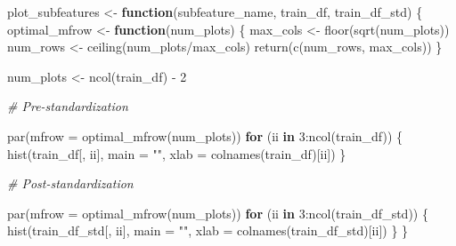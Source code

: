 \documentclass[
]{article}
\newenvironment{Shaded}{\begin{snugshade}}{\end{snugshade}}
\newcommand{\AttributeTok}[1]{\textcolor[rgb]{0.77,0.63,0.00}{#1}}
\newcommand{\CommentTok}[1]{\textcolor[rgb]{0.56,0.35,0.01}{\textit{#1}}}
\newcommand{\ControlFlowTok}[1]{\textcolor[rgb]{0.13,0.29,0.53}{\textbf{#1}}}
\newcommand{\DecValTok}[1]{\textcolor[rgb]{0.00,0.00,0.81}{#1}}
\newcommand{\FunctionTok}[1]{\textcolor[rgb]{0.00,0.00,0.00}{#1}}
\newcommand{\NormalTok}[1]{#1}
\newcommand{\OtherTok}[1]{\textcolor[rgb]{0.56,0.35,0.01}{#1}}
\newcommand{\SpecialCharTok}[1]{\textcolor[rgb]{0.00,0.00,0.00}{#1}}
\newcommand{\StringTok}[1]{\textcolor[rgb]{0.31,0.60,0.02}{#1}}
\begin{document}
\begin{Shaded}
\begin{Highlighting}[]
\NormalTok{plot\_subfeatures }\OtherTok{\textless{}{-}} \ControlFlowTok{function}\NormalTok{(subfeature\_name, train\_df, train\_df\_std) \{}
\NormalTok{    optimal\_mfrow }\OtherTok{\textless{}{-}} \ControlFlowTok{function}\NormalTok{(num\_plots) \{}
\NormalTok{        max\_cols }\OtherTok{\textless{}{-}} \FunctionTok{floor}\NormalTok{(}\FunctionTok{sqrt}\NormalTok{(num\_plots))}
\NormalTok{        num\_rows }\OtherTok{\textless{}{-}} \FunctionTok{ceiling}\NormalTok{(num\_plots}\SpecialCharTok{/}\NormalTok{max\_cols)}
        \FunctionTok{return}\NormalTok{(}\FunctionTok{c}\NormalTok{(num\_rows, max\_cols))}
\NormalTok{    \}}

\NormalTok{    num\_plots }\OtherTok{\textless{}{-}} \FunctionTok{ncol}\NormalTok{(train\_df) }\SpecialCharTok{{-}} \DecValTok{2}

    \CommentTok{\# Pre{-}standardization}

    \FunctionTok{par}\NormalTok{(}\AttributeTok{mfrow =} \FunctionTok{optimal\_mfrow}\NormalTok{(num\_plots))}
    \ControlFlowTok{for}\NormalTok{ (ii }\ControlFlowTok{in} \DecValTok{3}\SpecialCharTok{:}\FunctionTok{ncol}\NormalTok{(train\_df)) \{}
        \FunctionTok{hist}\NormalTok{(train\_df[, ii], }\AttributeTok{main =} \StringTok{""}\NormalTok{, }\AttributeTok{xlab =} \FunctionTok{colnames}\NormalTok{(train\_df)[ii])}
\NormalTok{    \}}

    \CommentTok{\# Post{-}standardization}

    \FunctionTok{par}\NormalTok{(}\AttributeTok{mfrow =} \FunctionTok{optimal\_mfrow}\NormalTok{(num\_plots))}
    \ControlFlowTok{for}\NormalTok{ (ii }\ControlFlowTok{in} \DecValTok{3}\SpecialCharTok{:}\FunctionTok{ncol}\NormalTok{(train\_df\_std)) \{}
        \FunctionTok{hist}\NormalTok{(train\_df\_std[, ii], }\AttributeTok{main =} \StringTok{""}\NormalTok{, }\AttributeTok{xlab =} \FunctionTok{colnames}\NormalTok{(train\_df\_std)[ii])}
\NormalTok{    \}}
\NormalTok{\}}
\end{Highlighting}
\end{Shaded}
\end{document}
